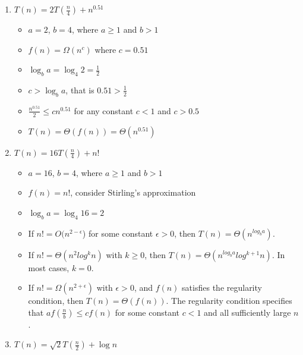 \documentclass[11pt]{article}
\begin{document}
\begin{enumerate}[label=\Alph*.]
	\item $T(n) = 2T(\frac{n}{4}) + n^{0.51}$
	
	\begin{itemize}
	
		\item $a = 2$, $b = 4$, where $a \geq 1$ and $b > 1$
		\item $f(n) = \Omega(n^c)$ where $c = 0.51$
		\item $\log_b a = \log_4 2 = \frac{1}{2}$
		\item $c > \log_b a$, that is $0.51 > \frac{1}{2}$
		\item $\frac{n^{0.51}}{2} \leq c n^{0.51}$ for any constant $c < 1$ and $c > 0.5$
		\item $T (n) = \Theta(f(n)) = \Theta (n^{0.51})$
	
	\end{itemize}
	
	\item $T(n) = 16 T(\frac{n}{4}) + n!$
	
	\begin{itemize}
	
		\item $a = 16$, $b = 4$, where $a \geq 1$ and $b > 1$
		\item $f(n) = n!$, consider Stirling's approximation
		
		
		\item $\log_b a = \log_4 16 = 2$
		
	
	\item If $n! = O(n^{2 - \epsilon}$) for some constant $\epsilon
  > 0$, then $T(n) = \Theta(n^{log_ba})$.
\item If $n! = \Theta(n^{2} log^kn)$ with $k \geq 0$, then
  $T(n) = \Theta(n^{log_ba} log^{k+1}n)$. In most cases, $k = 0$.
\item If $n! = \Omega(n^{2+\epsilon})$ with $\epsilon > 0$, and
  $f(n)$ satisfies the regularity condition, then $T(n) = \Theta( f(n)
  )$. The regularity condition specifies that $a f(\frac{n}{b}) \leq c
  f(n)$ for some constant $c < 1$ and all sufficiently large $n$.
	
	\end{itemize}
	
	\item $T(n) = \sqrt{2} T(\frac{n}{2}) + \log n$
	
	\begin{itemize}
	

\end{itemize}
\end{enumerate}
\end{document}
